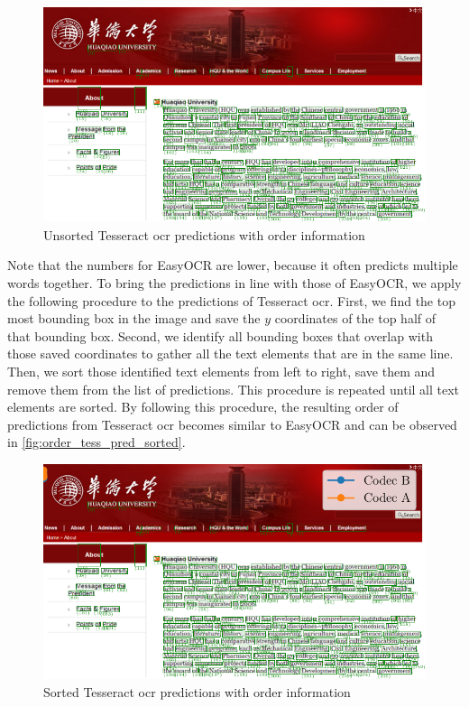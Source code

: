 \begin{figure}[h!]
    \centering
    \includegraphics[width=\textwidth]{../images/bbox_order_tess.pdf}
    \caption{Unsorted Tesseract \gls{ocr} predictions with order information}
    \label{fig:order_tess_pred}
\end{figure}
Note that the numbers for EasyOCR are lower, because it often predicts multiple words together.
To bring the predictions in line with those of EasyOCR, we apply the following procedure to the predictions of Tesseract \gls{ocr}.
First, we find the top most bounding box in the image and save the $y$ coordinates of the top half of that bounding box.
Second, we identify all bounding boxes that overlap with those saved coordinates to gather all the text elements that are in the same line.
Then, we sort those identified text elements from left to right, save them and remove them from the list of predictions.
This procedure is repeated until all text elements are sorted.
By following this procedure, the resulting order of predictions from Tesseract \gls{ocr} becomes similar to EasyOCR and can be observed in \autoref{fig:order_tess_pred_sorted}.
\begin{figure}[h!]
    \centering
    \includegraphics[width=\textwidth]{../images/bbox_order_tess_sorted.pdf}
    \caption{Sorted Tesseract \gls{ocr} predictions with order information}
    \label{fig:order_tess_pred_sorted}
\end{figure}
